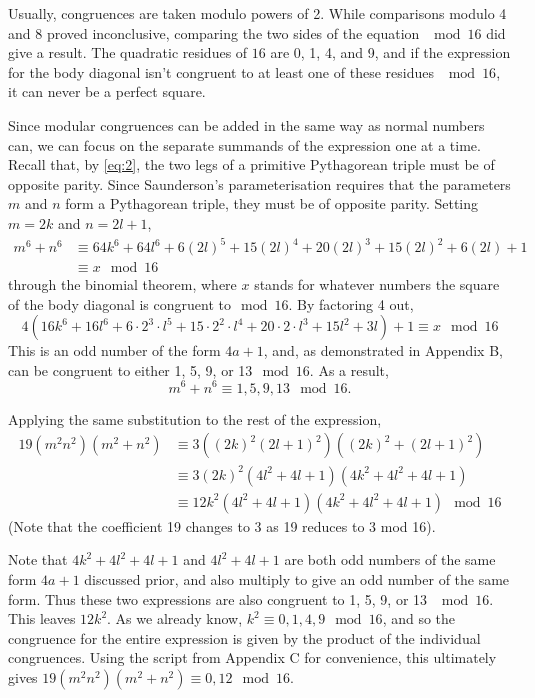 \documentclass[11pt]{article}
\begin{document}
Usually, congruences are taken modulo powers of 2. While comparisons modulo 4 and 8 proved inconclusive, comparing the two sides of the equation $\mod{16}$ did give a result. The quadratic residues of $16$ are 0, 1, 4, and 9, and if the expression for the body diagonal isn't congruent to at least one of these residues $\mod{16}$, it can never be a perfect square.

Since modular congruences can be added in the same way as normal numbers can, we can focus on the separate summands of the expression one at a time. Recall that, by \eqref{eq:2}, the two legs of a primitive Pythagorean triple must be of opposite parity. Since Saunderson's parameterisation requires that the parameters $m$ and $n$ form a Pythagorean triple, they must be of opposite parity. Setting $m=2k$ and $n=2l+1$, 
\begin{equation*}
\begin{aligned}
m^6+n^6&\equiv{64k^6+64l^6+6(2l)^5+15(2l)^4+20(2l)^3+15(2l)^2+6(2l)+1}\\
&\equiv{x}\mod{16}
\end{aligned}
\end{equation*}
through the binomial theorem, where $x$ stands for whatever numbers the square of the body diagonal is congruent to$\mod{16}$. By factoring 4 out,
$$4(16k^6+16l^6+6\cdot2^3\cdot{l^5}+15\cdot2^2\cdot{l^4}+20\cdot2\cdot{l^3}+15l^2+3l)+1\equiv{x}\mod{16}$$
This is an odd number of the form $4a+1$, and, as demonstrated in Appendix B, can be congruent to either 1, 5, 9, or 13$\mod{16}$.
As a result, 
$$m^6+n^6\equiv{1,5,9,13}\mod{16}.$$

Applying the same substitution to the rest of the expression, 
\begin{equation*}
\begin{aligned}
19(m^2n^2)(m^2+n^2)&\equiv{3((2k)^2(2l+1)^2)((2k)^2+(2l+1)^2)}\\
&\equiv{3(2k)^2(4l^2+4l+1)(4k^2+4l^2+4l+1)}\\
&\equiv{12k^2(4l^2+4l+1)(4k^2+4l^2+4l+1)\mod{16}}
\end{aligned}
\end{equation*}
(Note that the coefficient 19 changes to 3 as 19 reduces to 3 mod 16).

Note that $4k^2+4l^2+4l+1$ and $4l^2+4l+1$ are both odd numbers of the same form $4a+1$ discussed prior, and also multiply to give an odd number of the same form. Thus these two expressions are also congruent to 1, 5, 9, or 13 $\mod{16}$. This leaves $12k^2$. As we already know, $k^2\equiv{0,1,4,9}\mod{16}$, and so the congruence for the entire expression is given by the product of the individual congruences. Using the script from Appendix C for convenience, this ultimately gives $19(m^2n^2)(m^2+n^2)\equiv{0, 12}\mod{16}$.
\end{document}
